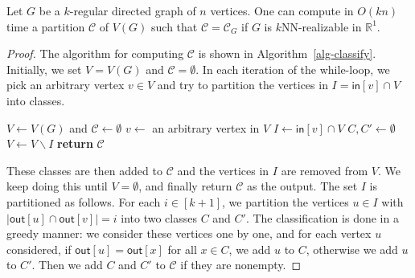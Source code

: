 \documentclass[english]{lipics-v2021}
\begin{document}
\begin{lemma} \label{lem-classify}
    Let $G$ be a $k$-regular directed graph of $n$ vertices.
    One can compute in $O(kn)$ time a partition $\mathcal{C}$ of $V(G)$ such that $\mathcal{C} = \mathcal{C}_G$ if $G$ is $k$NN-realizable in $\mathbb{R}^1$.
\end{lemma}

\begin{proof}
The algorithm for computing $\mathcal{C}$ is shown in Algorithm~\ref{alg-classify}.
Initially, we set $V = V(G)$ and $\mathcal{C} = \emptyset$.
In each iteration of the while-loop, we pick an arbitrary vertex $v \in V$ and try to partition the vertices in $I = \mathsf{in}[v] \cap V$ into classes.
\begin{algorithm}[t]
    \caption{\textsc{Classify}$(G)$}
    \begin{algorithmic}[1]
        \State $V \leftarrow V(G)$ and $\mathcal{C} \leftarrow \emptyset$
            \State $v \leftarrow$ an arbitrary vertex in $V$
            \State $I \leftarrow \mathsf{in}[v] \cap V$
                \State $C,C' \leftarrow \emptyset$
                    \EndIf
                \EndFor
                \EndIf
                \EndIf
            \EndFor
            \State $V \leftarrow V \backslash I$
        \EndWhile
        \State \textbf{return} $\mathcal{C}$
    \end{algorithmic}
    \label{alg-classify}
\end{algorithm}
These classes are then added to $\mathcal{C}$ and the vertices in $I$ are removed from $V$.
We keep doing this until $V = \emptyset$, and finally return $\mathcal{C}$ as the output.
The set $I$ is partitioned as follows.
For each $i \in [k+1]$, we partition the vertices $u \in I$ with $|\mathsf{out}[u] \cap \mathsf{out}[v]| = i$ into two classes $C$ and $C'$.
The classification is done in a greedy manner: we consider these vertices one by one, and for each vertex $u$ considered, if $\mathsf{out}[u] = \mathsf{out}[x]$ for all $x \in C$, we add $u$ to $C$, otherwise we add $u$ to $C'$.
Then we add $C$ and $C'$ to $\mathcal{C}$ if they are nonempty.


\end{proof}
\end{document}
